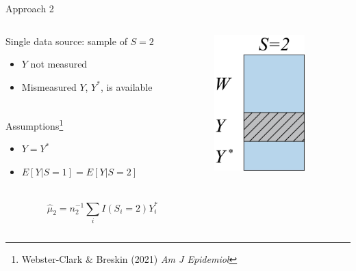 \documentclass{beamer}
\begin{document}
\begin{frame}{Approach 2}
	\begin{minipage}[0.2\textheight]{\textwidth}
		\begin{columns}[T]
			\begin{column}{0.6\textwidth}
				Single data source: sample of $S=2$
				\begin{itemize}
					\item $Y$ not measured
					\item Mismeasured $Y$, $Y^*$, is available
				\end{itemize}~\\
				Assumptions\footnote[frame]{Webster-Clark \& Breskin (2021) \textit{Am J Epidemiol}}
				\begin{itemize}
					\item $Y = Y^*$
					\item $E[Y | S=1] = E[Y | S=2]$
				\end{itemize}~\\
				\[\hat{\mu}_2 = n_2^{-1} \sum_i I(S_i = 2) Y_i^*\]
			\end{column}
			\begin{column}{0.35\textwidth}
				\includegraphics[width=3.5cm]{images/data_sources2.png}
			\end{column}
		\end{columns}
	\end{minipage}	
\end{frame}
\end{document}
